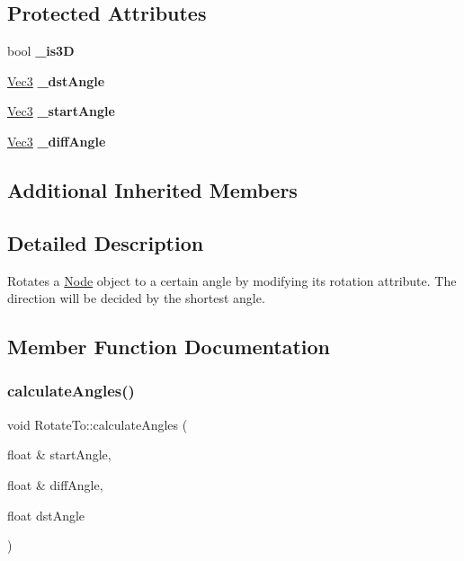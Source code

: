 \subsection*{Protected Attributes}
\begin{DoxyCompactItemize}
\item 
\mbox{\label{classRotateTo_aedf5ef6306084f002e5eb67ea84941e5}} 
bool {\bfseries \+\_\+is3D}
\item 
\mbox{\label{classRotateTo_ada069215eb5d9792d801e19186613f6d}} 
\hyperlink{classVec3}{Vec3} {\bfseries \+\_\+dst\+Angle}
\item 
\mbox{\label{classRotateTo_a5841d88bef34bb07125415ba2bdf3bef}} 
\hyperlink{classVec3}{Vec3} {\bfseries \+\_\+start\+Angle}
\item 
\mbox{\label{classRotateTo_a8df5ade0a3f15efd96f12c9016af0593}} 
\hyperlink{classVec3}{Vec3} {\bfseries \+\_\+diff\+Angle}
\end{DoxyCompactItemize}
\subsection*{Additional Inherited Members}


\subsection{Detailed Description}
Rotates a \hyperlink{classNode}{Node} object to a certain angle by modifying it\textquotesingle{}s rotation attribute. The direction will be decided by the shortest angle. 

\subsection{Member Function Documentation}
\mbox{\label{classRotateTo_a1f92283615886e098e6b755f3e520ee3}} 
\subsubsection{\texorpdfstring{calculate\+Angles()}{calculateAngles()}\hspace{0.1cm}{\footnotesize\ttfamily [1/2]}}
{\footnotesize\ttfamily void Rotate\+To\+::calculate\+Angles (\begin{DoxyParamCaption}\item[{float \&}]{start\+Angle,  }\item[{float \&}]{diff\+Angle,  }\item[{float}]{dst\+Angle }\end{DoxyParamCaption})}

